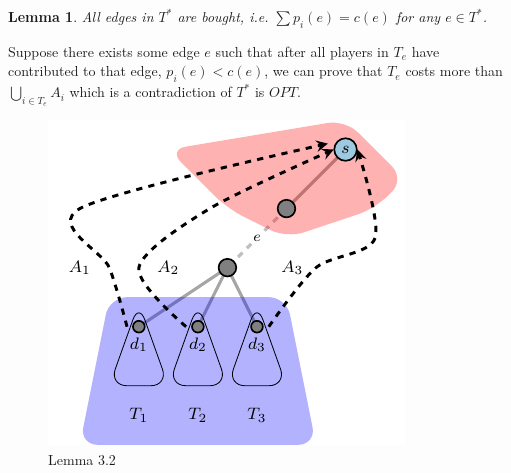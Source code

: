 \documentclass[11pt,psfig,times]{article}
\newtheorem{lemma}{Lemma}[section]
\begin{document}
	\begin{lemma}
		All edges in \(T^*\) are bought, i.e. $\sum p_i(e) = c(e)$ for any $e \in T^*$.
	\end{lemma}
	Suppose there exists some edge \(e\) such that after all players in \(T_e\) have contributed to that edge, \(p_i(e) < c(e)\), we can prove that \(T_e\) costs more than \(\bigcup_{i\in T_e} A_i\) which is a contradiction of \(T^*\) is \(OPT\).
	
	\begin{figure}[H]
		\begin{center}
		\includegraphics{pictures/lemma3.2.pdf}
		\end{center}
		\caption{Lemma 3.2}
		\label{fig:Lemma3.2}
	\end{figure}
		
	
	
\end{document}
